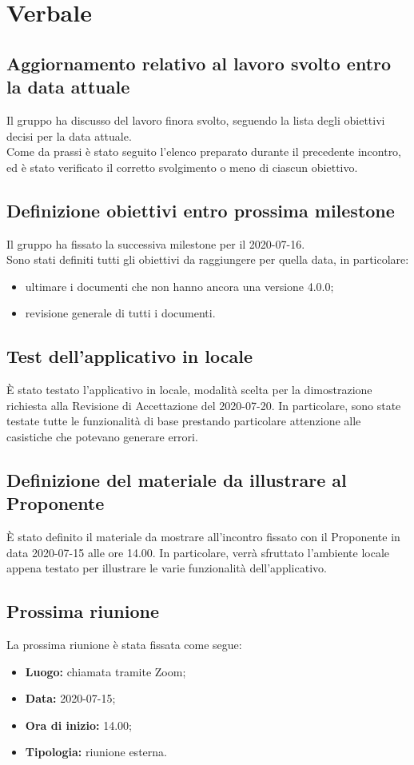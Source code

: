 \section{Verbale}

	\subsection{Aggiornamento relativo al lavoro svolto entro la data attuale}
	Il gruppo ha discusso del lavoro finora svolto, seguendo la lista degli obiettivi decisi per la data attuale. \\
	Come da prassi è stato seguito l'elenco preparato durante il precedente incontro, ed è stato verificato il corretto svolgimento o meno di ciascun obiettivo.
	
	\subsection{Definizione obiettivi entro prossima milestone}
		Il gruppo ha fissato la successiva milestone per il 2020-07-16.\\
		Sono stati definiti tutti gli obiettivi da raggiungere per quella data, in particolare:
		\begin{itemize}
			\item ultimare i documenti che non hanno ancora una versione 4.0.0;
			\item revisione generale di tutti i documenti.
		\end{itemize}
		
	\subsection{Test dell'applicativo in locale}
		È stato testato l'applicativo in locale, modalità scelta per la dimostrazione richiesta alla Revisione di Accettazione del 2020-07-20. In particolare, sono state testate tutte le funzionalità di base prestando particolare attenzione alle casistiche che potevano generare errori.
		
	\subsection{Definizione del materiale da illustrare al Proponente}
		È stato definito il materiale da mostrare all'incontro fissato con il Proponente in data 2020-07-15 alle ore 14.00. In particolare, verrà sfruttato l'ambiente locale appena testato per illustrare le varie funzionalità dell'applicativo.
	
	\subsection{Prossima riunione}
		La prossima riunione è stata fissata come segue:
		\begin{itemize}
			\item \textbf{Luogo:} chiamata tramite Zoom; 
			\item \textbf{Data:} 2020-07-15;
			\item \textbf{Ora di inizio:} 14.00;
			\item \textbf{Tipologia:} riunione esterna.
		\end{itemize}